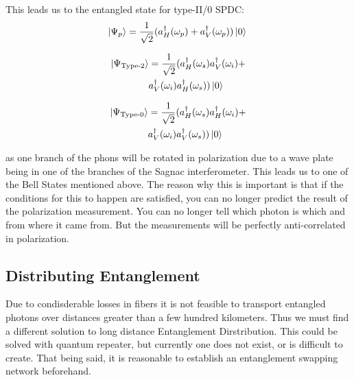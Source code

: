 \documentclass{article}
\begin{document}
This leads us to the entangled state for type-II/0 SPDC:
\begin{equation*}
	\ket{\Psi_{p}} = \frac{1}{\sqrt{2}} ( a_{H}^{\dagger} ( \omega_p ) + a_{V}^{\dagger} ( \omega_p ) )\ket{0}\\
\end{equation*}
\begin{minipage}[l]{0.48\textwidth}
	\begin{equation*}
		\begin{aligned}
			\ket{\Psi_{\text{Type-2}}} &= \frac{1}{\sqrt{2}}(a_{H}^{\dagger}(\omega_s)a_{V}^{\dagger}(\omega_i)+\\
								&a_{V}^{\dagger}(\omega_i)a_{H}^{\dagger}(\omega_s))\ket{0}\\
		\end{aligned}
	\end{equation*}
\end{minipage}
\begin{minipage}[r]{0.48\textwidth}
\begin{equation*}
	\begin{aligned}
		\ket{\Psi_{\text{Type-0}}} &= \frac{1}{\sqrt{2}}(a_{H}^{\dagger}(\omega_s)a_{H}^{\dagger}(\omega_i)+\\
								   &a_{V}^{\dagger}(\omega_i)a_{V}^{\dagger}(\omega_s))\ket{0}
	\end{aligned}
\end{equation*}
\end{minipage}

\par as one branch of the phons will be rotated in polarization due to a wave plate being in one of the branches of the Sagnac interferometer.
This leads us to one of the Bell States mentioned above.
The reason why this is important is that if the conditions for this to happen are satisfied, you can no longer 
predict the result of the polarization measurement. You can no longer tell which photon is which and from where it came from.
But the measurements will be perfectly anti-correlated in polarization. 

\subsection{Distributing Entanglement}
Due to condisderable losses in fibers it is not feasible to transport entangled photons over distances greater than a few hundred kilometers. Thus 
we must find a different solution to long distance Entanglement Dirstribution. This could be solved with quantum repeater, but currently one does not exist, 
or is difficult to create. That being said, it is reasonable to establish an entanglement swapping network beforehand.
\end{document}
